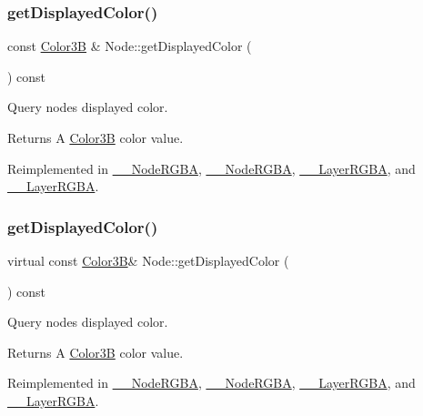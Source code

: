 \subsubsection{\texorpdfstring{get\+Displayed\+Color()}{getDisplayedColor()}\hspace{0.1cm}{\footnotesize\ttfamily [1/2]}}
{\footnotesize\ttfamily const \hyperlink{structColor3B}{Color3B} \& Node\+::get\+Displayed\+Color (\begin{DoxyParamCaption}{ }\end{DoxyParamCaption}) const\hspace{0.3cm}{\ttfamily [virtual]}}

Query node\textquotesingle{}s displayed color. \begin{DoxyReturn}{Returns}
A \hyperlink{structColor3B}{Color3B} color value. 
\end{DoxyReturn}


Reimplemented in \hyperlink{class____NodeRGBA_ae17a9077b86673cb75f799cb4f6c8a1d}{\+\_\+\+\_\+\+Node\+R\+G\+BA}, \hyperlink{class____NodeRGBA_ae17a9077b86673cb75f799cb4f6c8a1d}{\+\_\+\+\_\+\+Node\+R\+G\+BA}, \hyperlink{class____LayerRGBA_a621d9a8fe47abd33ec00bd3754bf6ec2}{\+\_\+\+\_\+\+Layer\+R\+G\+BA}, and \hyperlink{class____LayerRGBA_a621d9a8fe47abd33ec00bd3754bf6ec2}{\+\_\+\+\_\+\+Layer\+R\+G\+BA}.

\mbox{\label{classNode_a1285caec57206ce980b727b86e1976f7}} 
\subsubsection{\texorpdfstring{get\+Displayed\+Color()}{getDisplayedColor()}\hspace{0.1cm}{\footnotesize\ttfamily [2/2]}}
{\footnotesize\ttfamily virtual const \hyperlink{structColor3B}{Color3B}\& Node\+::get\+Displayed\+Color (\begin{DoxyParamCaption}{ }\end{DoxyParamCaption}) const\hspace{0.3cm}{\ttfamily [virtual]}}

Query node\textquotesingle{}s displayed color. \begin{DoxyReturn}{Returns}
A \hyperlink{structColor3B}{Color3B} color value. 
\end{DoxyReturn}


Reimplemented in \hyperlink{class____NodeRGBA_ae17a9077b86673cb75f799cb4f6c8a1d}{\+\_\+\+\_\+\+Node\+R\+G\+BA}, \hyperlink{class____NodeRGBA_ae17a9077b86673cb75f799cb4f6c8a1d}{\+\_\+\+\_\+\+Node\+R\+G\+BA}, \hyperlink{class____LayerRGBA_a621d9a8fe47abd33ec00bd3754bf6ec2}{\+\_\+\+\_\+\+Layer\+R\+G\+BA}, and \hyperlink{class____LayerRGBA_a621d9a8fe47abd33ec00bd3754bf6ec2}{\+\_\+\+\_\+\+Layer\+R\+G\+BA}.

